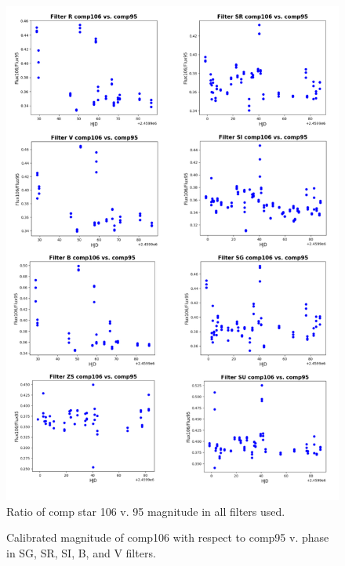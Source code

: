 \documentclass[linenumbers]{aastex631}
\begin{document}
\begin{figure}[H]
\centering
\includegraphics[width=15cm]{Figures/Ratio-of-Comps-106-v.-95-Mag-All-Filters.png}
\caption{Ratio of comp star 106 v. 95 magnitude in all filters used.} 
\label{fig:compratio}
\end{figure}

\begin{figure}[H]
\caption{Calibrated magnitude of comp106 with respect to comp95 v. phase in SG, SR, SI, B, and V filters.} 
\label{fig:calcomp106}
\end{figure}
\end{document}
